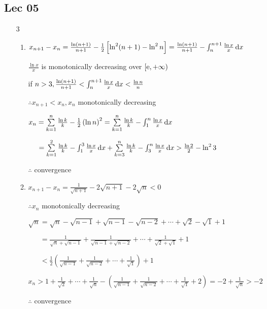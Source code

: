\subsection{Lec 05}
    \begin{enumerate}[1]
        \item[3]
        \begin{enumerate}[(1)]
            \item $x_{n+1}-x_n=\frac{\ln (n+1)}{n+1} - \frac{1}{2}\left[\ln ^2(n+1)-\ln ^2n\right]=\frac{\ln (n+1)}{n+1} - \int_n^{n+1} \frac{\ln x}{x} \dif x$
            \par  $\frac{\ln x}{x}$ is monotonically decreasing over $[\mathrm{e} ,+\infty) $
            \par if $n>3, \frac{\ln (n+1)}{n+1}<\int_n^{n+1} \frac{\ln x}{x} \dif x < \frac{\ln n}{n} $
            \par $\therefore x_{n+1}<x_n, x_n $ monotonically decreasing
            \par $ x_n =  \sum\limits_{k=1}^n \frac{\ln k}{k} -\frac{1}{2}\left(\ln n \right)^2 = \sum\limits_{k=1}^n \frac{\ln k}{k} - \int_1^{n} \frac{\ln x}{x} \dif x $
            \par $\phantom{x_n} = \sum\limits_{k=1}^2 \frac{\ln k}{k} - \int_1^{3} \frac{\ln x}{x} \dif x + \sum\limits_{k=3}^n \frac{\ln k}{k} - \int_3^{n} \frac{\ln x}{x} \dif x>  \frac{\ln 2}{2} - \ln ^2 3 $
            \par $\therefore $ convergence

            \item $x_{n+1}-x_n = \frac{1}{\sqrt{n+1}} -2\sqrt{n+1} -2\sqrt{n} < 0$
            \par $\therefore x_n $ monotonically decreasing
            \par $ \sqrt{n} = \sqrt{n} -\sqrt{n-1} + \sqrt{n-1} -\sqrt{n-2} + \cdots + \sqrt{2} -\sqrt{1} + 1 $
            \par $ \phantom{\sqrt{n}}= \frac{1}{\sqrt{n} + \sqrt{n-1}} + \frac{1}{\sqrt{n-1} + \sqrt{n-2}}  + \cdots + \frac{1}{\sqrt{2} + \sqrt{1}}  + 1 $
            \par $ \phantom{\sqrt{n}} < \frac{1}{2}\left( \frac{1}{ \sqrt{n-1}} + \frac{1}{ \sqrt{n-2}}  + \cdots + \frac{1}{ \sqrt{1}}\right) + 1 $
            \par $ x_n> 1 +\frac{1}{\sqrt{2}}+\cdots +\frac{1}{\sqrt{n}}-\left( \frac{1}{ \sqrt{n-1}} + \frac{1}{ \sqrt{n-2}}  + \cdots + \frac{1}{ \sqrt{1}}+2\right) =-2 + \frac{1}{\sqrt{n}} > -2 $
            \par $\therefore $ convergence
        \end{enumerate}


\end{enumerate}
